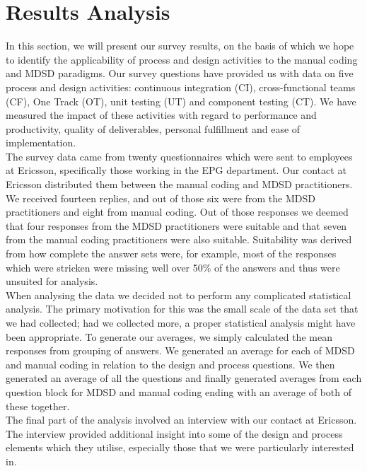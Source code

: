 \documentclass[final_report_innit.tex]{subfiles}
\begin{document}
\section{Results Analysis}

In this section, we will present our survey results, on the basis of which we hope to identify the applicability of process and design activities to the manual coding and MDSD paradigms. Our survey questions have provided us with data on five process and design activities: continuous integration (CI), cross-functional teams (CF), One Track (OT), unit testing (UT) and component testing (CT). We have measured the impact of these activities with regard to performance and productivity, quality of deliverables, personal fulfillment and ease of implementation.
\\

The survey data came from twenty questionnaires which were sent to employees at Ericsson, specifically those working in the EPG department. Our contact at Ericsson distributed them between the manual coding and MDSD practitioners. We received fourteen replies, and out of those six were from the MDSD practitioners and eight from manual coding. Out of those responses we deemed that four responses from the MDSD practitioners were suitable and that seven from the manual coding practitioners were also suitable. Suitability was derived from how complete the answer sets were, for example, most of the responses which were stricken were missing well over 50\% of the answers and thus were unsuited for analysis.
\\

When analysing the data we decided not to perform any complicated statistical analysis. The primary motivation for this was the small scale of the data set that we had collected; had we collected more, a proper statistical analysis might have been appropriate. To generate our averages, we simply calculated the mean responses from grouping of answers. We generated an average for each of MDSD and manual coding in relation to the design and process questions. We then generated an average of all the questions and finally generated averages from each question block for MDSD and manual coding ending with an average of both of these together.
\\

The final part of the analysis involved an interview with our contact at Ericsson. The interview provided additional insight into some of the design and process elements which they utilise, especially those that we were particularly interested in.
\\
\end{document}
